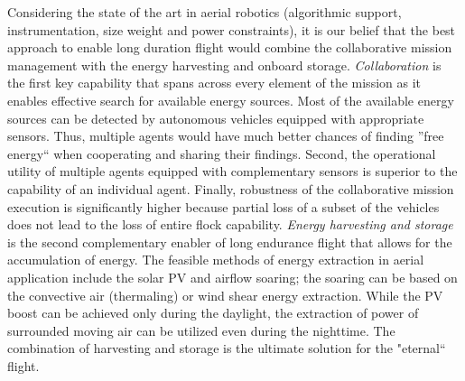 \documentclass{ifacconf}
\begin{document}
%

Considering the state of the art in aerial robotics (algorithmic support,
instrumentation, size weight and power constraints), it is our belief that
the best approach to enable long duration flight would combine the
collaborative mission management with the energy harvesting and onboard
storage. \emph{Collaboration} is the first key capability that spans across
every element of the mission as it enables effective search for available
energy sources. Most of the available energy sources can be detected by
autonomous vehicles equipped with appropriate sensors. Thus, multiple agents
would have much better chances of finding ''free energy`` when cooperating
and sharing their findings. Second, the operational utility of multiple
agents equipped with complementary sensors is superior to the capability of
an individual agent. Finally, robustness of the collaborative mission
execution is significantly higher because partial loss of a subset of the
vehicles does not lead to the loss of entire flock capability. \emph{Energy
harvesting and storage} is the second complementary enabler of long endurance
flight that allows for the accumulation of energy. The feasible methods of
energy extraction in aerial application include the solar PV and airflow
soaring; the soaring can be based on the convective air (thermaling) or wind
shear energy extraction. While the PV boost can be achieved only during the
daylight, the extraction of power of surrounded moving air can be utilized
even during the nighttime. The combination of harvesting and storage is the
ultimate solution for the "eternal`` flight.

\end{document}
